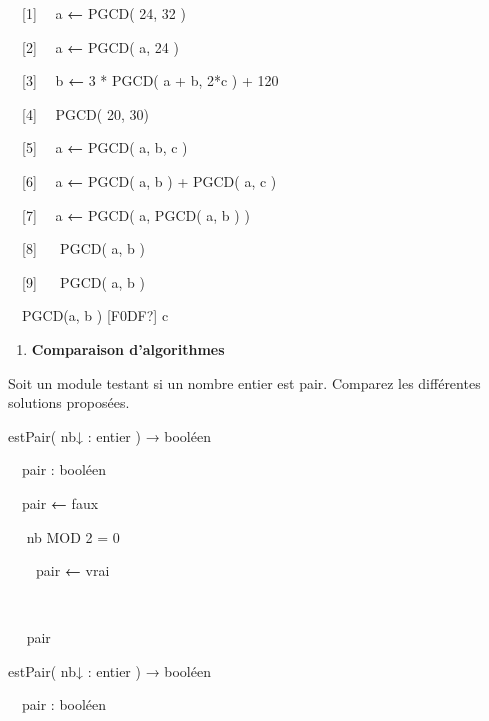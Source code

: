 {{\sffamily
{}}


\bigskip

{\sffamily
\ \ [1] \ \ a {\textbf{←}} PGCD( 24, 32 )}

{\sffamily
\ \ [2] \ \ a {\textbf{←}} PGCD( a, 24 )}

{\sffamily
\ \ [3] \ \ b {\textbf{←}} 3 * PGCD( a + b, 2*c
) + 120}

{\sffamily
\ \ [4] \ \ PGCD( 20, 30)}

{\sffamily
\ \ [5] \ \ a {\textbf{←}} PGCD( a, b, c )}

{\sffamily
\ \ [6] \ \ a {\textbf{←}} PGCD( a, b ) + PGCD(
a, c )}

{\sffamily
\ \ [7] \ \ a {\textbf{←}} PGCD( a, PGCD( a, b )
)}

{\sffamily
\ \ [8] \ \  PGCD( a, b )}

{\sffamily
\ \ [9] \ \  PGCD( a, b
)}

{\sffamily
[10] \ \ PGCD(a, b )
{\textrm{[F0DF?]}}{ }c}


\bigskip

\liststyleExercice
\setcounter{saveenum}{\value{enumi}}
\begin{enumerate}
\setcounter{enumi}{\value{saveenum}}
\item {\sffamily\bfseries
Comparaison d'algorithmes}
\end{enumerate}
{
Soit un module testant si un nombre entier est pair. Comparez les
différentes solutions proposées.}

{\sffamily
{} estPair( nb{↓ :} entier
) {→} booléen}

{\sffamily
\ \ pair : booléen}

{\sffamily
\ \ pair {\textbf{←}}{
faux}}

{\sffamily
\ \  nb MOD 2 = 0 }

{\sffamily
\ \ \ \ pair
{\textbf{←}}{ vrai}}

{\sffamily
\ \  }

{\sffamily
\ \  pair}

{\sffamily
{} }


\bigskip

{\sffamily
{} estPair( nb{↓ :} entier
) {→} booléen}

{\sffamily
\ \ pair : booléen}

}

